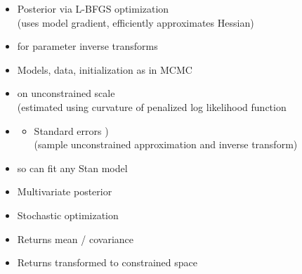 \documentclass[10pt]{report}
\begin{document}
%
\begin{itemize}
\item Posterior  via L-BFGS optimization
  \\ {\footnotesize (uses model gradient, efficiently approximates Hessian)}
\item {} for parameter inverse transforms
\item Models, data, initialization as in MCMC
  \vfill
  \item  {} on unconstrained scale
    \\
    {\footnotesize  (estimated using curvature of penalized log likelihood function}
\item {}
  \vspace*{-4pt}
  \begin{itemize}\small
  \item Standard errors )
    \\
    {\footnotesize  (sample unconstrained approximation and inverse transform)}
  \end{itemize}
\end{itemize}


%
\begin{itemize}
\item {} so can fit any Stan model
\item Multivariate  posterior
\item Stochastic  optimization
\item Returns  mean / covariance
\item Returns  transformed to constrained space
\end{itemize}
\end{document}
